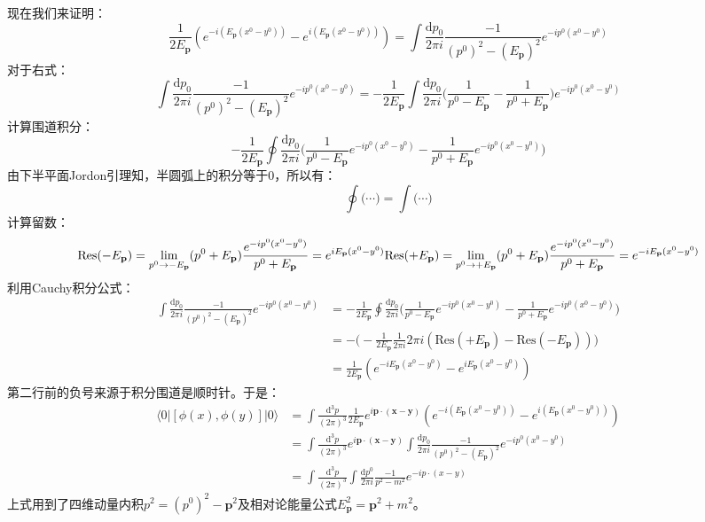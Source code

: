 \documentclass{book}
\begin{document}
现在我们来证明：
$$
\frac{1}{2E_\mathbf{p}}\left(e^{-i(E_\mathbf{p}(x^0-y^0))}-e^{i(E_\mathbf{p}(x^0-y^0))}\right)=\int\frac{\mathrm{d}p_0}{2\pi i}\frac{-1}{(p^0)^2-(E_\mathbf p)^2}e^{-ip^0(x^0-y^0)}
$$
对于右式：
$$
\int\frac{\mathrm{d}p_0}{2\pi i}\frac{-1}{(p^0)^2-(E_\mathbf p)^2}e^{-ip^0(x^0-y^0)}=-\frac{1}{2E_\mathbf{p}}\int\frac{\mathrm{d}p_0}{2\pi i}\Big(\frac{1}{p^{0}-E_\mathbf p}-\frac{1}{p^{0}+E_\mathbf p}\Big)e^{-ip^0(x^0-y^0)}
$$
计算围道积分：
$$
-\frac{1}{2E_\mathbf{p}}\oint\frac{\mathrm{d}p_0}{2\pi i}\Big(\frac{1}{p^{0}-E_\mathbf p}e^{-ip^0(x^0-y^0)}-\frac{1}{p^{0}+E_\mathbf p}e^{-ip^0(x^0-y^0)}\Big)
$$
由下半平面Jordon引理知，半圆弧上的积分等于$0$，所以有：
$$
\oint\Big(\cdots\Big)=\int\Big(\cdots\Big)
$$
计算留数：
$$
\mathrm{Res}(-E_\mathbf{p})=\lim_{p^0\to -E_\mathbf p}(p^0+E_\mathbf p)\frac{e^{-ip^0(x^0-y^0)}}{p^0+E_\mathbf{p}}=e^{iE_\mathbf{p}(x^0-y^0)} \\
\mathrm{Res}(+E_\mathbf{p})=\lim_{p^0\to +E_\mathbf p}(p^0+E_\mathbf p)\frac{e^{-ip^0(x^0-y^0)}}{p^0+E_\mathbf{p}}=e^{-iE_\mathbf{p}(x^0-y^0)} \\
$$
利用Cauchy积分公式：
$$
\begin{aligned}
\int\frac{\mathrm{d}p_0}{2\pi i}\frac{-1}{(p^0)^2-(E_\mathbf p)^2}e^{-ip^0(x^0-y^0)}&=-\frac{1}{2E_\mathbf{p}}\oint\frac{\mathrm{d}p_0}{2\pi i}\Big(\frac{1}{p^{0}-E_\mathbf p}e^{-ip^0(x^0-y^0)}-\frac{1}{p^{0}+E_\mathbf p}e^{-ip^0(x^0-y^0)}\Big)\\&=-\Big(-\frac{1}{2E_\mathbf{p}}\frac{1}{2\pi i}2\pi i(\mathrm{Res}(+E_\mathbf{p})-\mathrm{Res}(-E_\mathbf{p}))\Big)\\&=\frac{1}{2E_\mathbf{p}}( e^{-iE_\mathbf{p}(x^0-y^0)}-e^{iE_\mathbf{p}(x^0-y^0)} )
\end{aligned}
$$
第二行前的负号来源于积分围道是顺时针。于是：
$$
\begin{aligned}
\langle0|\left[\phi(x),\phi(y)\right]|0\rangle&=\int\frac{\mathrm{d}^3p}{(2\pi)^3}\frac{1}{2E_\mathbf{p}}e^{i\mathbf{p}\cdot(\mathbf{x}-\mathbf{y})}(e^{-i(E_\mathbf{p}(x^0-y^0))}-e^{i(E_\mathbf{p}(x^0-y^0))}) \\
&=\int\frac{\mathrm{d}^3p}{(2\pi)^3}e^{i\mathbf{p}\cdot(\mathbf{x}-\mathbf{y})}\int\frac{\mathrm{d}p_0}{2\pi i}\frac{-1}{(p^0)^2-(E_\mathbf p)^2}e^{-ip^0(x^0-y^0)} \\
&=\int\frac{\mathrm{d}^{3}p}{(2\pi)^{3}}\int\frac{\mathrm{d}p^{0}}{2\pi i}\frac{-1}{p^{2}-m^{2}}e^{-ip\cdot(x-y)}
\end{aligned}
$$
上式用到了四维动量内积$p^2=(p^0)^2-\mathbf{p}^2$及相对论能量公式$E_\mathbf{p}^2=\mathbf{p}^2+m^2$。
\end{document}
